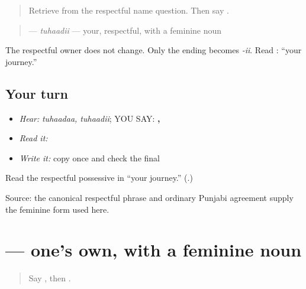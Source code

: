 \label{lesson:PA-C185-tuhadi}



\begin{quote}
Retrieve \textbf{} from the respectful name question. Then say \textbf{}.
\end{quote}

\begin{grammarlens}[title={Grammar Lens: keep respect, change agreement}]
\begin{quote}
\textbf{} — \emph{tuhaadii} — your, respectful, with a feminine noun
\end{quote}

The respectful owner does not change. Only the ending becomes \emph{-ii}. Read \textbf{ }: “your journey.”
\end{grammarlens}

\subsection*{Your turn}
\begin{itemize}
\raggedright
  \item \emph{Hear:} \emph{tuhaadaa, tuhaadii}; YOU SAY: \textbf{, }
  \item \emph{Read it:} \textbf{ }
  \item \emph{Write it:} copy \textbf{} once and check the final \textbf{}
\end{itemize}

\begin{tcolorbox}[breakable,colback=teal!4,colframe=teal!35!black,title={Before you move on}]
Read the respectful possessive in “your journey.” (\textbf{}.)

Source: the canonical respectful \textbf{} phrase and ordinary Punjabi agreement supply the feminine form used here.
\end{tcolorbox}
\section[\texorpdfstring{\pa{ਆਪਣੀ} (aapnii)}{ਆਪਣੀ (aapnii)}]{ — one's own, with a feminine noun}

\label{lesson:PA-C185-apni}



\begin{quote}
Say \textbf{}, then \textbf{}.
\end{quote}

